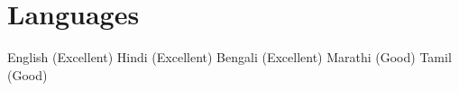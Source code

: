 \section{Languages}
English (Excellent) \textbar{} Hindi (Excellent) \textbar{} Bengali (Excellent) \textbar{} Marathi (Good) \textbar{} Tamil (Good)
